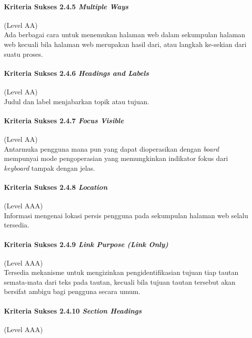 \paragraph{Kriteria Sukses 2.4.5 \textit{Multiple Ways}}
\label{sec:kriteria_sukses_2.4.5}
(Level AA)\\

Ada berbagai cara untuk menemukan halaman web dalam sekumpulan halaman web kecuali bila halaman web merupakan hasil dari, atau langkah ke-sekian dari suatu proses.

\paragraph{Kriteria Sukses 2.4.6 \textit{Headings and Labels}}
\label{sec:kriteria_sukses_2.4.6}
(Level AA)\\
Judul dan label menjabarkan topik atau tujuan.

\paragraph{Kriteria Sukses 2.4.7 \textit{Focus Visible}}
\label{sec:kriteria_sukses_2.4.7}
(Level AA)\\

Antarmuka pengguna mana pun yang dapat dioperasikan dengan \textit{board} mempunyai mode pengoperasian yang memungkinkan indikator fokus dari \textit{keyboard} tampak dengan jelas.

\paragraph{Kriteria Sukses 2.4.8 \textit{Location}}
\label{sec:kriteria_sukses_2.4.8}
(Level AAA)\\

Informasi mengenai lokasi persis pengguna pada sekumpulan halaman web selalu tersedia.

\paragraph{Kriteria Sukses 2.4.9 \textit{Link Purpose (Link Only)}}
\label{sec:kriteria_sukses_2.4.9}
(Level AAA)\\

Tersedia mekanisme untuk mengizinkan pengidentifikasian tujuan tiap tautan semata-mata dari teks pada tautan, kecuali bila tujuan tautan tersebut akan bersifat ambigu bagi pengguna secara umum.

\paragraph{Kriteria Sukses 2.4.10 \textit{Section Headings}}
\label{sec:kriteria_sukses_2.4.10}
(Level AAA)\\

